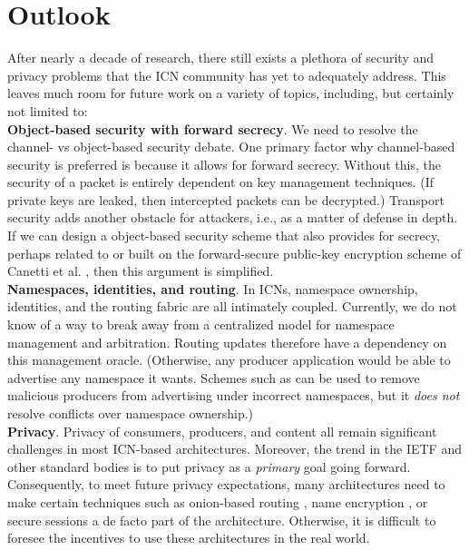 \section{Outlook}
\label{sec:outlook}
After nearly a decade of research, there still exists a plethora of security
and privacy problems that the ICN community has yet to adequately address. 
This leaves much room for future work on a variety of topics, including, but
certainly not limited to:\\

\noindent
{\bf Object-based security with forward secrecy}. We need to resolve the 
    channel- vs object-based security debate. One primary factor why channel-based
    security is preferred is because it allows for forward secrecy. Without this,
    the security of a packet is entirely dependent on key management techniques.
    (If private keys are leaked, then intercepted packets can be decrypted.)
    Transport security adds another obstacle for attackers, i.e., as a matter
    of defense in depth. If we can design a object-based security scheme that
    also provides for secrecy, perhaps related to or built on the forward-secure public-key
    encryption scheme of Canetti et al. \cite{canetti2003forward}, then this argument is simplified.\\

\noindent
{\bf Namespaces, identities, and routing}. In ICNs, namespace ownership, identities, and
    the routing fabric are all intimately coupled. Currently, we do not know of a way
    to break away from a centralized model for namespace management and arbitration. 
    Routing updates therefore have a dependency on this management oracle. (Otherwise,
    any producer application would be able to advertise any namespace it wants. Schemes
    such as \cite{dibenedetto2015mitigating} can be used to remove malicious producers
    from advertising under incorrect namespaces, but it \emph{does not} resolve conflicts
    over namespace ownership.)\\

\noindent
{\bf Privacy}. Privacy of consumers, producers, and content all remain significant
    challenges in most ICN-based architectures. Moreover, the trend in the IETF and other
    standard bodies is to put privacy as a \emph{primary} goal going forward. Consequently,
    to meet future privacy expectations, many architectures need to make certain techniques
    such as onion-based routing \cite{uzun2011anonymous}, name encryption \cite{privacy}, or secure
    sessions \cite{wood-icnrg-ccnxkeyexchange-00} a de facto part of the architecture. 
    Otherwise, it is difficult to foresee the incentives to use these architectures in the
    real world.
